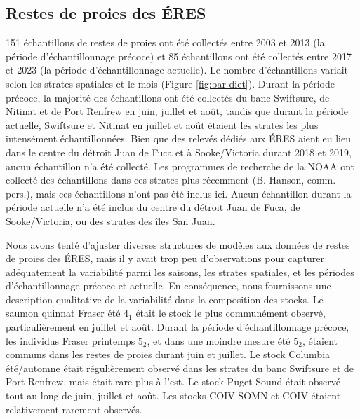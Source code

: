 \subsection{Restes de proies des ÉRES}

151 échantillons de restes de proies ont été collectés entre 2003 et 2013 (la période d'échantillonnage précoce) et 85 échantillons ont été collectés entre 2017 et 2023 (la période d'échantillonnage actuelle). Le nombre d'échantillons variait selon les strates spatiales et le mois (Figure \ref{fig:bar-diet}). Durant la période précoce, la majorité des échantillons ont été collectés du banc Swiftsure, de Nitinat et de Port Renfrew en juin, juillet et août, tandis que durant la période actuelle, Swiftsure et Nitinat en juillet et août étaient les strates les plus intensément échantillonnées. Bien que des relevés dédiés aux ÉRES aient eu lieu dans le centre du détroit Juan de Fuca et à Sooke/Victoria durant 2018 et 2019, aucun échantillon n'a été collecté. Les programmes de recherche de la NOAA ont collecté des échantillons dans ces strates plus récemment (B. Hanson, comm. pers.), mais ces échantillons n'ont pas été inclus ici. Aucun échantillon durant la période actuelle n'a été inclus du centre du détroit Juan de Fuca, de Sooke/Victoria, ou des strates des îles San Juan.

Nous avons tenté d'ajuster diverses structures de modèles aux données de restes de proies des ÉRES, mais il y avait trop peu d'observations pour capturer adéquatement la variabilité parmi les saisons, les strates spatiales, et les périodes d'échantillonnage précoce et actuelle. En conséquence, nous fournissons une description qualitative de la variabilité dans la composition des stocks. Le saumon quinnat Fraser été $4_1$ était le stock le plus communément observé, particulièrement en juillet et août. Durant la période d'échantillonnage précoce, les individus Fraser printemps $5_2$, et dans une moindre mesure été $5_2$, étaient communs dans les restes de proies durant juin et juillet. Le stock Columbia été/automne était régulièrement observé dans les strates du banc Swiftsure et de Port Renfrew, mais était rare plus à l'est. Le stock Puget Sound était observé tout au long de juin, juillet et août. Les stocks COIV-SOMN et COIV étaient relativement rarement observés.

